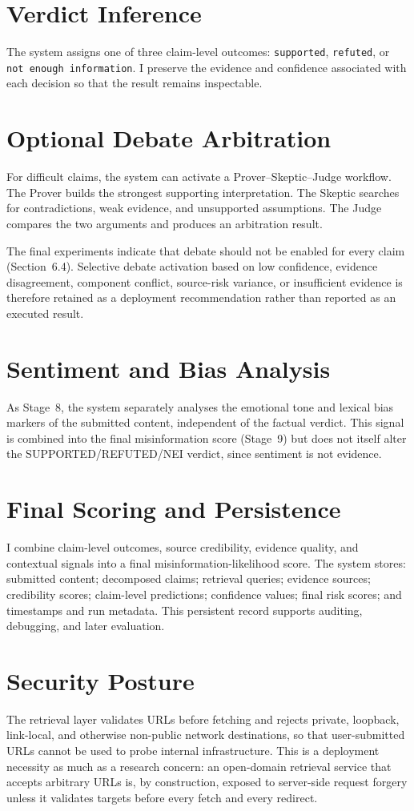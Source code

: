 \documentclass[12pt,a4paper,openany]{report}
\begin{document}
\section{Verdict Inference}
The system assigns one of three claim-level outcomes: \texttt{supported}, \texttt{refuted}, or \texttt{not enough information}. I preserve the evidence and confidence associated with each decision so that the result remains inspectable.

\section{Optional Debate Arbitration}
For difficult claims, the system can activate a Prover--Skeptic--Judge workflow. The Prover builds the strongest supporting interpretation. The Skeptic searches for contradictions, weak evidence, and unsupported assumptions. The Judge compares the two arguments and produces an arbitration result.

The final experiments indicate that debate should not be enabled for every claim (Section~6.4). Selective debate activation based on low confidence, evidence disagreement, component conflict, source-risk variance, or insufficient evidence is therefore retained as a deployment recommendation rather than reported as an executed result.

\section{Sentiment and Bias Analysis}
As Stage~8, the system separately analyses the emotional tone and lexical bias markers of the submitted content, independent of the factual verdict. This signal is combined into the final misinformation score (Stage~9) but does not itself alter the SUPPORTED/REFUTED/NEI verdict, since sentiment is not evidence.

\section{Final Scoring and Persistence}
I combine claim-level outcomes, source credibility, evidence quality, and contextual signals into a final misinformation-likelihood score. The system stores: submitted content; decomposed claims; retrieval queries; evidence sources; credibility scores; claim-level predictions; confidence values; final risk scores; and timestamps and run metadata. This persistent record supports auditing, debugging, and later evaluation.

\section{Security Posture}
The retrieval layer validates URLs before fetching and rejects private, loopback, link-local, and otherwise non-public network destinations, so that user-submitted URLs cannot be used to probe internal infrastructure. This is a deployment necessity as much as a research concern: an open-domain retrieval service that accepts arbitrary URLs is, by construction, exposed to server-side request forgery unless it validates targets before every fetch and every redirect.
\end{document}
